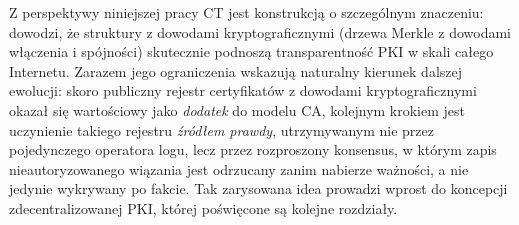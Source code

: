 Z perspektywy niniejszej pracy CT jest konstrukcją o szczególnym znaczeniu: dowodzi, że struktury z dowodami kryptograficznymi (drzewa Merkle z dowodami włączenia i spójności) skutecznie podnoszą transparentność PKI w skali całego Internetu. Zarazem jego ograniczenia wskazują naturalny kierunek dalszej ewolucji: skoro publiczny rejestr certyfikatów z dowodami kryptograficznymi okazał się wartościowy jako \emph{dodatek} do modelu CA, kolejnym krokiem jest uczynienie takiego rejestru \emph{źródłem prawdy}, utrzymywanym nie przez pojedynczego operatora logu, lecz przez rozproszony konsensus, w którym zapis nieautoryzowanego wiązania jest odrzucany zanim nabierze ważności, a nie jedynie wykrywany po fakcie. Tak zarysowana idea prowadzi wprost do koncepcji zdecentralizowanej PKI, której poświęcone są kolejne rozdziały.
